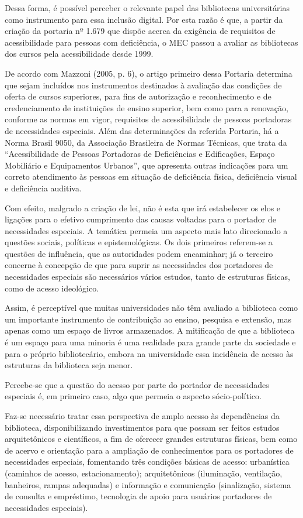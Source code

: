 	Dessa forma, é possível perceber o relevante papel das bibliotecas universitárias como instrumento para essa inclusão digital. Por esta razão é que, a partir da criação da portaria nº 1.679 que dispõe acerca da exigência de requisitos de acessibilidade para pessoas com deficiência, o MEC passou a avaliar as bibliotecas dos cursos pela acessibilidade desde 1999.

	De acordo com Mazzoni (2005, p. 6), o artigo primeiro dessa Portaria determina que sejam incluídos nos instrumentos destinados à avaliação das condições de oferta de cursos superiores, para fins de autorização e reconhecimento e de credenciamento de instituições de ensino superior, bem como para a renovação, conforme as normas em vigor, requisitos de acessibilidade de pessoas portadoras de necessidades especiais. Além das determinações da referida Portaria, há a Norma Brasil 9050, da Associação Brasileira de Normas Técnicas, que trata da “Acessibilidade de Pessoas Portadoras de Deficiências e Edificações, Espaço Mobiliário e Equipamentos Urbanos”, que apresenta outras indicações para um correto atendimento às pessoas em situação de deficiência física, deficiência visual e deficiência auditiva.

	Com efeito, malgrado a criação de lei, não é esta que irá estabelecer os elos e ligações para o efetivo cumprimento das causas voltadas para o portador de necessidades especiais. A temática permeia um aspecto mais lato direcionado a questões sociais, políticas e epistemológicas. Os dois primeiros referem-se a questões de influência, que as autoridades podem encaminhar; já o terceiro concerne à concepção de que para suprir as necessidades dos portadores de necessidades especiais são necessários vários estudos, tanto de estruturas físicas, como de acesso ideológico.

	Assim, é perceptível que muitas universidades não têm avaliado a biblioteca como um importante instrumento de contribuição ao ensino, pesquisa e extensão, mas apenas como um espaço de livros armazenados. A mitificação de que a biblioteca é um espaço para uma minoria é uma realidade para grande parte da sociedade e para o próprio bibliotecário, embora na universidade essa incidência de acesso às estruturas da biblioteca seja menor.

	Percebe-se que a questão do acesso por parte do portador de necessidades especiais é, em primeiro caso, algo que permeia o aspecto sócio-político.

	Faz-se necessário tratar essa perspectiva de amplo acesso às dependências da biblioteca, disponibilizando investimentos para que possam ser feitos estudos arquitetônicos e científicos, a fim de oferecer grandes estruturas físicas, bem como de acervo e orientação para a ampliação de conhecimentos para os portadores de necessidades especiais, fomentando três condições básicas de acesso: urbanística (caminhos de acesso, estacionamento); arquitetônicos (iluminação, ventilação, banheiros, rampas adequadas) e informação e comunicação (sinalização, sistema de consulta e empréstimo, tecnologia de apoio para usuários portadores de necessidades especiais).
	
